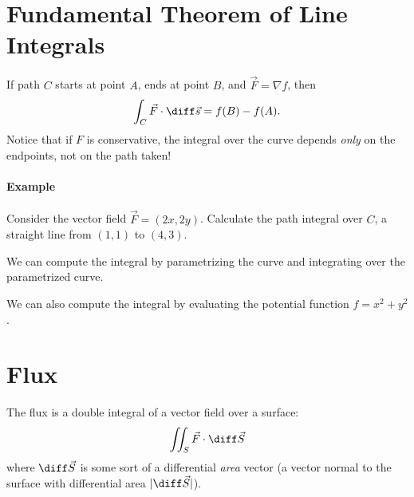 \documentclass{multi}
\begin{document}
\section*{Fundamental Theorem of Line Integrals}

If path \(C\) starts at point \(A\), ends at point \(B\), and \(\vec F = \nabla
f\), then
\[
    \int_C \vec F \cdot \diff \vec s = f(B) - f(A).
\]
Notice that if \(F\) is conservative, the integral over the curve depends
\emph{only} on the endpoints, not on the path taken!

\paragraph{Example}

Consider the vector field \(\vec F = (2x, 2y)\). Calculate the path integral
over \(C\), a straight line from \((1, 1)\) to \((4, 3)\).

We can compute the integral by parametrizing the curve and integrating over the
parametrized curve.

We can also compute the integral by evaluating the potential function \(f = x^2
+ y^2\).

\section*{Flux}

The flux is a double integral of a vector field over a surface:
\[
    \iint_S \vec F \cdot \diff \vec S
\]
where \(\diff \vec S\) is some sort of a differential \emph{area} vector (a
vector normal to the surface with differential area \(|\diff \vec S|\)).
\begin{center}
  
\end{center}

\end{document}
